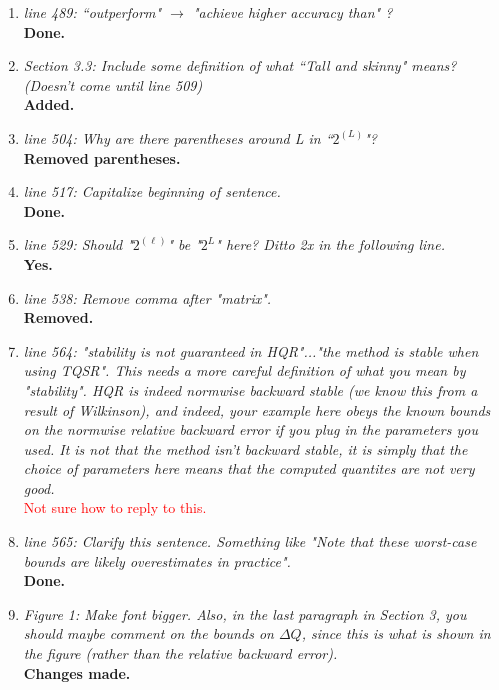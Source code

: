 \documentclass[final,onefignum,onetabnum]{siamart190516}
\newcommand{\red}[1]{\textcolor{red}{#1}}
\begin{document}
\begin{enumerate}
	\item {\it line 489: ``outperform" $\rightarrow$ "achieve higher accuracy than" ?}\\
	{\bf Done.}
	
	\item {\it Section 3.3: Include some definition of what ``Tall and skinny" means? (Doesn't come until line 509)}\\
	{\bf Added.}
	
	\item {\it line 504: Why are there parentheses around L in ``$2^{(L)}$"?}\\
	{\bf Removed parentheses.}
	
	\item {\it line 517: Capitalize beginning of sentence.}\\
	{\bf Done.}
	
	\item {\it line 529: Should "$2^{(\ell)}$" be "$2^L$" here? Ditto 2x in the following line. }\\
	{\bf Yes.}
	
	\item {\it line 538: Remove comma after "matrix".}\\
	{\bf Removed.}
	
	\item {\it line 564: "stability is not guaranteed in HQR"..."the method is stable when using TQSR". This needs a more careful definition of what you mean by "stability". HQR is indeed normwise backward stable (we know this from a result of Wilkinson), and indeed, your example here obeys the known bounds on the normwise relative backward error if you plug in the parameters you used. It is not that the method isn't backward stable, it is simply that the choice of parameters here means that the computed quantites are not very good. }\\
	\red{ Not sure how to reply to this. }
	
	
	\item {\it line 565: Clarify this sentence. Something like "Note that these worst-case bounds are likely overestimates in practice".}\\
	{\bf Done.}
	
	\item {\it Figure 1: Make font bigger. Also, in the last paragraph in Section 3, you should maybe comment on the bounds on $\Delta Q$, since this is what is shown in the figure (rather than the relative backward error). }\\
	{\bf Changes made.}
	

\end{enumerate}
\end{document}
